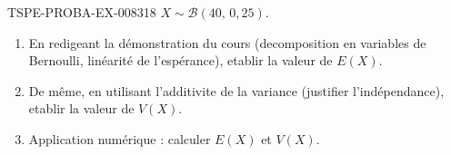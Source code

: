 \begin{exercice}{TSPE-PROBA-EX-008}{3}{18}
$X \sim \mathcal{B}(40,\,0{,}25)$.
\begin{enumerate}
  \item En redigeant la démonstration du cours (decomposition en variables de Bernoulli, linéarité de l'espérance), etablir la valeur de $E(X)$.
  \item De même, en utilisant l'additivite de la variance (justifier l'indépendance), etablir la valeur de $V(X)$.
  \item Application numérique : calculer $E(X)$ et $V(X)$.
\end{enumerate}
\end{exercice}
